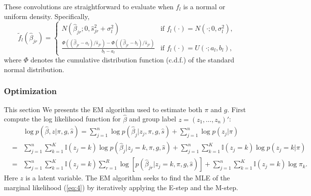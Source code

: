 \documentclass[12pt]{article}
\begin{document}
\vspace{4mm}\noindent These convolutions are straightforward to evaluate when $f_l$ is a normal or uniform density. Specifically, 
\begin{equation} \label{eqn:uconv}
\tilde{f}_l(\hat\beta_{jr})  = 
\begin{cases}
N(\hat\beta_{jr};0, \hat s_{jr}^2 +  \sigma_l^2) & \text{if $f_l(\cdot) = N(\cdot; 0, \sigma_l^2)$}, \\
\frac{\Phi((\hat\beta_{jr}-a_l)/\hat s_{jr}) - \Phi((\hat\beta_{jr}-b_l)/\hat s_{jr})}{b_l-a_l} & \text{if $f_l(\cdot) = U(\cdot; a_l,b_l)$},
\end{cases}
\end{equation}
where $\Phi$ denotes the cumulative distribution function (c.d.f.) of the standard normal distribution.

\vspace{5mm}
\subsubsection{Optimization}

\vspace{4mm}\noindent  This section We presents the EM algorithm used to estimate both $\pi$ and $g$. First compute the log likelihood function for $\hat\beta$ and group label $z=(z_1,\ldots,z_n)'$:
\begin{eqnarray}
    &&\log p(\hat\beta,z|\pi,g,\hat s) = \sum_{j=1}^n\log p(\hat\beta_j|z_j,\pi,g,\hat s)+\sum_{j=1}^n\log p(z_j|\pi) \nonumber\\
    &=& \sum_{j=1}^n\sum_{k=1}^K\mathbb{I}(z_j=k)\log p(\hat\beta_j|z_j=k,\pi,g,\hat s)
    +\sum_{j=1}^n\sum_{k=1}^K\mathbb{I}(z_j=k)\log p(z_j=k|\pi)\nonumber\\
    &=& \sum_{j=1}^n\sum_{k=1}^K\mathbb{I}(z_j=k)\sum_{r=1}^R\log \left[p(\hat\beta_{jr}|z_j=k,\pi,g,\hat s) \right]+\sum_{j=1}^n\sum_{k=1}^K\mathbb{I}(z_j=k)\log\pi_k.
\end{eqnarray}
Here $z$ is a latent variable. The EM algorithm seeks to find the MLE of the marginal likelihood (\ref{eq:4}) by iteratively applying the E-step and the M-step.
\end{document}
